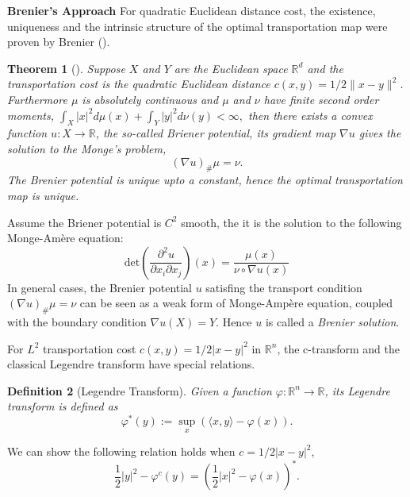 \documentclass{article}
\newtheorem{theorem}{Theorem}[section]
\newtheorem{definition}[theorem]{Definition}
\begin{document}
\vspace{2mm}
\noindent\textbf{Brenier's Approach} For quadratic Euclidean distance cost, the existence, uniqueness and the intrinsic structure of the optimal transportation map were proven by Brenier (\cite{brenier1991polar}).
 \begin{theorem}[\cite{brenier1991polar}]
 \label{thm:Brenier}
 Suppose $X$ and $Y$ are the Euclidean space $\mathbb{R}^d$ and the transportation cost is the quadratic Euclidean distance
  $c(x,y) = 1/2\|x-y\|^2$. Furthermore $\mu$ is absolutely continuous and $\mu$ and $\nu$ have finite second order moments,
 $%
    \int_X |x|^2 d\mu(x) + \int_Y |y|^2 d\nu(y) < \infty,
 $%
  then there exists a convex function $u: X \to \mathbb{R}$, the so-called Briener potential, its gradient map $\nabla u$ gives the solution to the Monge's problem,
  \begin{equation}
    (\nabla u)_{\#} \mu = \nu.
  \end{equation}
  The Brenier potential is unique upto a constant, hence the optimal transportation map is unique.
 \end{theorem}
Assume the Briener potential is $C^2$ smooth, the it is the solution to the following Monge-Am\`{e}re equation:
\begin{equation}
\text{det} \left(\frac{\partial^2 u}{\partial x_i \partial x_j}\right) (x) = \frac{\mu(x)}{\nu\circ \nabla u(x)}
\end{equation}
In general cases, the Brenier potential $u$ satisfing the transport condition
$(\nabla u)_{\#} \mu = \nu$ can be seen as a weak form of Monge-Amp\`{e}re equation, coupled with the boundary condition $\nabla u(X)=Y$. Hence $u$ is called a \emph{Brenier solution}.


For $L^2$ transportation cost $c(x,y)=1/2|x-y|^2$ in $\mathbb{R}^n$, the c-transform and the classical Legendre transform have special relations.
\begin{definition}[Legendre Transform] Given a function $\varphi:\mathbb{R}^n\to \mathbb{R}$, its Legendre transform is defined as
\begin{equation}
    \varphi^*(y):=\sup_x \left(\langle x, y \rangle - \varphi(x)\right).
    \label{eqn:Legendre_transform}
\end{equation}
\end{definition}

We can show the following relation holds when $c=1/2|x-y|^2$,
\begin{equation}
    \frac{1}{2} |y|^2 - \varphi^c(y) = \left( \frac{1}{2} |x|^2 - \varphi(x) \right)^*.
\end{equation}
\end{document}
